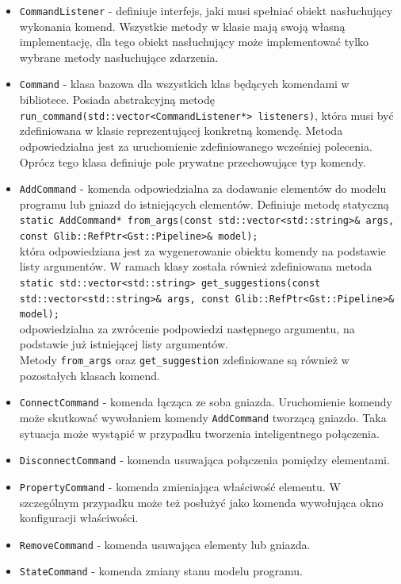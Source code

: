 \documentclass[12pt]{article}
\begin{document}
\begin{itemize}
 \setlength{\itemsep}{0em}
\item \texttt{CommandListener} - definiuje interfejs, jaki musi spełniać obiekt nasłuchujący wykonania komend. Wszystkie metody w klasie mają swoją własną implementację, dla tego obiekt nasłuchujący może implementować tylko wybrane metody nasłuchujące zdarzenia.
\item \texttt{Command} - klasa bazowa dla wszystkich klas będących komendami w bibliotece. Posiada abstrakcyjną metodę \texttt{run\_command(std::vector<CommandListener*> listeners)}, która musi być zdefiniowana w klasie reprezentującej konkretną komendę. Metoda odpowiedzialna jest za uruchomienie zdefiniowanego wcześniej polecenia. Oprócz tego klasa definiuje pole prywatne przechowujące typ komendy.
\item \texttt{AddCommand} - komenda odpowiedzialna za dodawanie elementów do modelu programu lub gniazd do istniejących elementów. Definiuje metodę statyczną \\
\texttt{static AddCommand* from\_args(const std::vector<std::string>\& args, const Glib::RefPtr<Gst::Pipeline>\& model);}\\
która odpowiedziana jest za wygenerowanie obiektu komendy na podstawie listy argumentów.
W ramach klasy została również zdefiniowana metoda \\
\texttt{static std::vector<std::string> get\_suggestions(const std::vector<std::string>\& args, const Glib::RefPtr<Gst::Pipeline>\& model);}\\
odpowiedzialna za zwrócenie podpowiedzi następnego argumentu, na podstawie już istniejącej listy argumentów.\\
Metody \texttt{from\_args} oraz \texttt{get\_suggestion} zdefiniowane są również w pozostałych klasach komend.
\item \texttt{ConnectCommand} - komenda łącząca ze soba gniazda. Uruchomienie komendy może skutkować wywołaniem komendy \texttt{AddCommand} tworzącą gniazdo. Taka sytuacja może wystąpić w przypadku tworzenia inteligentnego połączenia.
\item \texttt{DisconnectCommand} - komenda usuwająca połączenia pomiędzy elementami.
\item \texttt{PropertyCommand} - komenda zmieniająca właściwość elementu. W szczególnym przypadku może też posłużyć jako komenda wywołująca okno konfiguracji właściwości.
\item \texttt{RemoveCommand} - komenda usuwająca elementy lub gniazda.
\item \texttt{StateCommand} - komenda zmiany stanu modelu programu.
\end{itemize}
\end{document}
